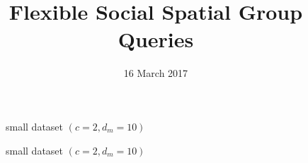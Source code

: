 \documentclass{vldb}
\begin{document}
	\title{ Flexible Social Spatial Group Queries}
	
	
	\author{
	}
	
	\date{16 March 2017}
	\maketitle
	
	

	
	\begin{multicols}{2}
	\begin {figure}
			\begin{center}
			\scalebox{.5}{}
			\end{center}
			\caption{ small dataset $( c=2, d_m=10) $}
			\end {figure}
		    
	
	\begin {figure}
			\begin{center}
			\scalebox{.5}{}
			\end{center}
			\caption{ small dataset $( c=2, d_m=10) $}
	\end {figure}
		
	
	
	\end{multicols}
	
\end{document}
